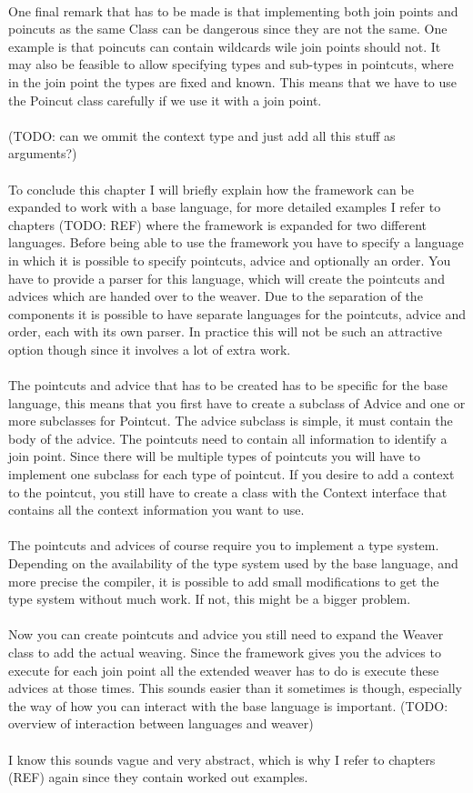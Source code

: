 \documentclass[a4paper]{report}
\begin{document}
\\
One final remark that has to be made is that implementing both join points and poincuts as the same Class can be dangerous since they are not the same. One example is that poincuts can contain wildcards wile join points should not. It may also be feasible to allow specifying types and sub-types in pointcuts, where in the join point the types are fixed and known. This means that we have to use the Poincut class carefully if we use it with a join point.\\
\\
(TODO: can we ommit the context type and just add all this stuff as arguments?)\\
\\
To conclude this chapter I will briefly explain how the framework can be expanded to work with a base language, for more detailed examples I refer to chapters (TODO: REF) where the framework is expanded for two different languages. Before being able to use the framework you have to specify a language in which it is possible to specify pointcuts, advice and optionally an order. You have to provide a parser for this language, which will create the pointcuts and advices which are handed over to the weaver. Due to the separation of the components it is possible to have separate languages for the pointcuts, advice and order, each with its own parser. In practice this will not be such an attractive option though since it involves a lot of extra work.\\
\\
The pointcuts and advice that has to be created has to be specific for the base language, this means that you first have to create a subclass of Advice and one or more subclasses for Pointcut.
The advice subclass is simple, it must contain the body of the advice. The pointcuts need to contain all information to identify a join point. Since there will be multiple types of pointcuts you will have to implement one subclass for each type of pointcut. If you desire to add a context to the pointcut, you still have to create a class with the Context interface that contains all the context information you want to use.\\
\\
The pointcuts and advices of course require you to implement a type system. Depending on the availability of the type system used by the base language, and more precise the compiler, it is possible to add small modifications to get the type system without much work. If not, this might be a bigger problem.\\
\\
Now you can create pointcuts and advice you still need to expand the Weaver class to add the actual weaving. Since the framework gives you the advices to execute for each join point all the extended weaver has to do is execute these advices at those times. This sounds easier than it sometimes is though, especially the way of how you can interact with the base language is important. (TODO: overview of interaction between languages and weaver)\\
\\
I know this sounds vague and very abstract, which is why I refer to chapters (REF) again since they contain worked out examples.
\end{document}
